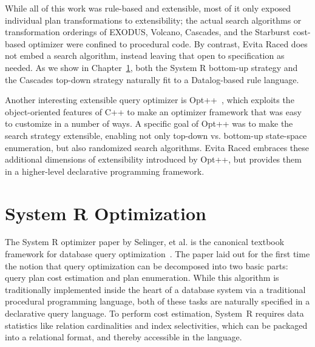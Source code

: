 While all of this work was rule-based and extensible, most of it only exposed
individual plan transformations to extensibility; the actual search algorithms
or transformation orderings of EXODUS, Volcano, Cascades, and the Starburst
cost-based optimizer were confined to procedural code.  By contrast, Evita
Raced does not embed a search algorithm, instead leaving that open to
specification as needed.  As we show in Chapter~\ref{ch:opt:sec:systemr}, both
the System R bottom-up strategy and the Cascades top-down strategy naturally
fit to a Datalog-based rule language.

Another interesting extensible query optimizer is Opt++~\cite{kabradewitt},
which exploits the object-oriented features of C++ to make an optimizer
framework that was easy to customize in a number of ways.  A specific goal of
Opt++ was to make the search strategy extensible, enabling not only top-down
vs.  bottom-up state-space enumeration, but also randomized search algorithms.
Evita Raced embraces these additional dimensions of extensibility introduced by
Opt++, but provides them in a higher-level declarative programming framework.


\section{System R Optimization}
\label{ch:opt:sec:systemr}

The System R optimizer paper by Selinger, et al.  is the canonical textbook
framework for database query optimization~\cite{selinger}.  The paper laid out
for the first time the notion that query optimization can be decomposed into
two basic parts: query plan cost estimation and plan enumeration.  While this
algorithm is traditionally implemented inside the heart of a database system
via a traditional procedural programming language, both of these tasks are
naturally specified in a declarative query language.  To perform cost
estimation, System~R requires data statistics like relation cardinalities and
index selectivities, which can be packaged into a relational format, and
thereby accessible in the \OVERLOG language.

